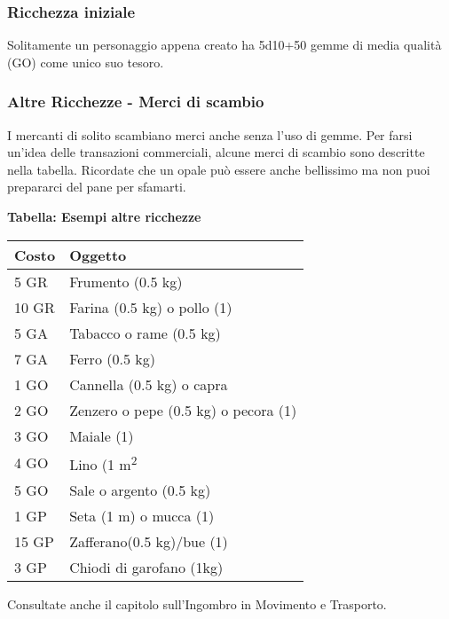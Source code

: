 \documentclass[12pt,a4paper,twoside,openany]{book}
\begin{document}
\begin{multicols}{2}

\subsubsection{Ricchezza iniziale}

Solitamente un personaggio appena creato ha 5d10+50 gemme di media qualità (GO) come unico suo tesoro.

\subsubsection{Altre Ricchezze - Merci di scambio}

I mercanti di solito scambiano merci anche senza l'uso di gemme.
Per farsi un'idea delle transazioni commerciali, alcune merci di scambio sono descritte nella tabella. Ricordate che un opale può essere anche bellissimo ma non puoi prepararci del pane per sfamarti.

\medskip

\textbf{Tabella: Esempi altre ricchezze}

\medskip


\begin{tabular}{ll}
\textbf{Costo} & \textbf{Oggetto}\\
\toprule
5 GR & Frumento (0.5 kg)\\
10 GR & Farina (0.5 kg) o pollo (1)\\
5 GA & Tabacco o rame (0.5 kg)\\
7 GA & Ferro (0.5 kg)\\
1 GO & Cannella (0.5 kg) o capra \\
2 GO & Zenzero o pepe (0.5 kg) o pecora (1)\\
3 GO & Maiale (1) \\
4 GO & Lino (1 m\textsuperscript{2}\\
5 GO & Sale o argento (0.5 kg) \\
1 GP& Seta (1 m) o mucca (1)\\
15 GP& Zafferano(0.5 kg)/bue (1)\\
3 GP&Chiodi di garofano (1kg)\\
\end{tabular}

\medskip

Consultate anche il capitolo sull'Ingombro in Movimento e Trasporto.

\end{multicols}
\end{document}
